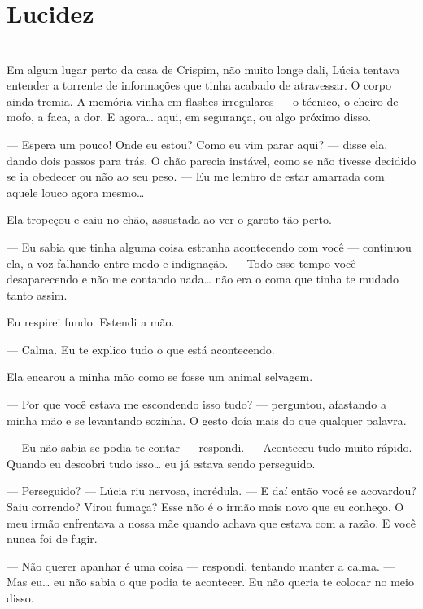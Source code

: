 \newpage

\ifdefined\useChapters
\chapter{Lucidez}
\else
\chapter{}
\fi

Em algum lugar perto da casa de Crispim, não muito longe dali, Lúcia tentava entender a torrente de informações que tinha acabado de atravessar. O corpo ainda tremia. A memória vinha em flashes irregulares — o técnico, o cheiro de mofo, a faca, a dor. E agora… aqui, em segurança, ou algo próximo disso.

— Espera um pouco! Onde eu estou? Como eu vim parar aqui? — disse ela, dando dois passos para trás. O chão parecia instável, como se não tivesse decidido se ia obedecer ou não ao seu peso. — Eu me lembro de estar amarrada com aquele louco agora mesmo…

Ela tropeçou e caiu no chão, assustada ao ver o garoto tão perto.

— Eu sabia que tinha alguma coisa estranha acontecendo com você — continuou ela, a voz falhando entre medo e indignação. — Todo esse tempo você desaparecendo e não me contando nada… não era o coma que tinha te mudado tanto assim.

Eu respirei fundo. Estendi a mão.

— Calma. Eu te explico tudo o que está acontecendo.

Ela encarou a minha mão como se fosse um animal selvagem.

— Por que você estava me escondendo isso tudo? — perguntou, afastando a minha mão e se levantando sozinha. O gesto doía mais do que qualquer palavra.

— Eu não sabia se podia te contar — respondi. — Aconteceu tudo muito rápido. Quando eu descobri tudo isso… eu já estava sendo perseguido.

— Perseguido? — Lúcia riu nervosa, incrédula. — E daí então você se acovardou? Saiu correndo? Virou fumaça? Esse não é o irmão mais novo que eu conheço. O meu irmão enfrentava a nossa mãe quando achava que estava com a razão. E você nunca foi de fugir.

— Não querer apanhar é uma coisa — respondi, tentando manter a calma. — Mas eu… eu não sabia o que podia te acontecer. Eu não queria te colocar no meio disso.

